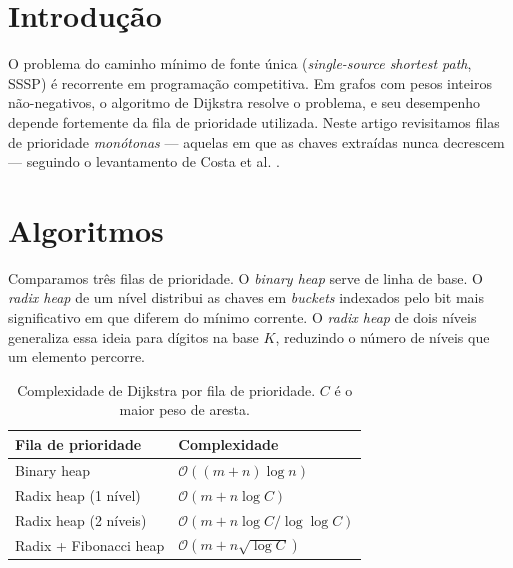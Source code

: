 
\section{Introdução}
O problema do caminho mínimo de fonte única (\textit{single-source shortest
path}, SSSP) é recorrente em programação competitiva. Em grafos com pesos
inteiros não-negativos, o algoritmo de Dijkstra resolve o problema, e seu
desempenho depende fortemente da fila de prioridade utilizada. Neste artigo
revisitamos filas de prioridade \textit{monótonas} --- aquelas em que as chaves
extraídas nunca decrescem --- seguindo o levantamento de Costa et al.
\cite{costa2025monotone}.

\section{Algoritmos}
Comparamos três filas de prioridade. O \textit{binary heap} serve de linha de
base. O \textit{radix heap} de um nível distribui as chaves em \textit{buckets}
indexados pelo bit mais significativo em que diferem do mínimo corrente. O
\textit{radix heap} de dois níveis generaliza essa ideia para dígitos na base
$K$, reduzindo o número de níveis que um elemento percorre.

\begin{table}[H]
    \centering
    \caption{Complexidade de Dijkstra por fila de prioridade. $C$ é o maior
    peso de aresta.}
    \label{tab:complexidade}
    \footnotesize
    \begin{tabular}{@{}ll@{}}
        \toprule
        Fila de prioridade & Complexidade \\
        \midrule
        Binary heap & $\mathcal{O}((m+n)\log n)$ \\
        Radix heap (1 nível) & $\mathcal{O}(m + n\log C)$ \\
        Radix heap (2 níveis) & $\mathcal{O}(m + n\log C / \log\log C)$ \\
        Radix + Fibonacci heap & $\mathcal{O}(m + n\sqrt{\log C})$ \\
        \bottomrule
    \end{tabular}
\end{table}

